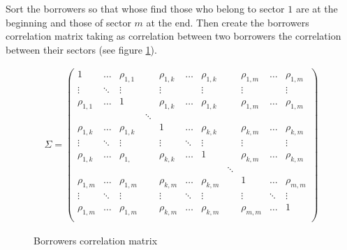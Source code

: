 \documentclass[a4paper,12pt,final]{article}
\begin{document}
Sort the borrowers so that whose find those who belong to sector $1$ are at the beginning 
and those of sector $m$ at the end. Then create the borrowers correlation matrix 
taking as correlation between two borrowers the correlation between their sectors
(see figure \ref{borrowercorrel}).

\begin{figure}[!hb]
\begin{displaymath}
\begin{array}{c}
\Sigma=
\left(
\begin{array}{ccccccccccc}
1           & \dots    & \rho_{1,1}  &          & \rho_{1,k}  & \dots   & \rho_{1,k}  &         & \rho_{1,m}  & \dots      & \rho_{1,m}  \\
\vdots      & \ddots   & \vdots      &          & \vdots      &         & \vdots      &         & \vdots      &            & \vdots      \\
\rho_{1,1}  & \dots    & 1           &          & \rho_{1,k}  & \dots   & \rho_{1,k}  &         & \rho_{1,m}  & \dots      & \rho_{1,m}  \\

            &          &             & \ddots   &             &         &             &         &             &            &             \\

\rho_{1,k}  & \dots    & \rho_{1,k}  &          & 1           & \dots   & \rho_{k,k}  &         & \rho_{k,m}  & \dots      & \rho_{k,m}  \\
\vdots      & \ddots   & \vdots      &          & \vdots      & \ddots  & \vdots      &         & \vdots      &            & \vdots      \\
\rho_{1,k}  & \dots    & \rho_{1, }  &          & \rho_{k,k}  & \dots   & 1           &         & \rho_{k,m}  & \dots      & \rho_{k,m}  \\

            &          &             &          &             &         &             & \ddots  &             &            &             \\

\rho_{1,m}  & \dots    & \rho_{1,m}  &          & \rho_{k,m}  & \dots   & \rho_{k,m}  &         & 1           & \dots      & \rho_{m,m}  \\
\vdots      & \ddots   & \vdots      &          & \vdots      & \ddots  & \vdots      &         & \vdots      & \ddots     & \vdots      \\
\rho_{1,m}  & \dots    & \rho_{1,m}  &          & \rho_{k,m}  & \dots   & \rho_{k,m}  &         & \rho_{m,m}  & \dots      & 1           \\
\end{array}
\right)
\end{array}
\end{displaymath}
\caption{Borrowers correlation matrix}
\label{borrowercorrel}
\end{figure}
\end{document}
